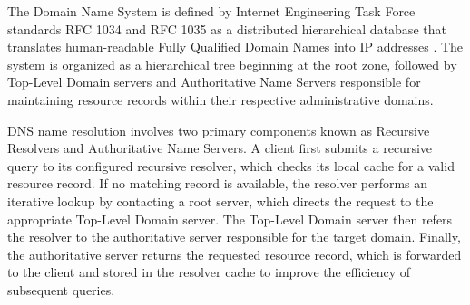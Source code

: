 \documentclass[14pt, a4paper, oneside]{report}
\begin{document}
The Domain Name System is defined by Internet Engineering Task Force standards RFC 1034 and RFC 1035 as a distributed hierarchical database that translates human-readable Fully Qualified Domain Names into IP addresses \cite{rfc1034, rfc1035}. The system is organized as a hierarchical tree beginning at the root zone, followed by Top-Level Domain servers and Authoritative Name Servers responsible for maintaining resource records within their respective administrative domains.

DNS name resolution involves two primary components known as Recursive Resolvers and Authoritative Name Servers. A client first submits a recursive query to its configured recursive resolver, which checks its local cache for a valid resource record. If no matching record is available, the resolver performs an iterative lookup by contacting a root server, which directs the request to the appropriate Top-Level Domain server. The Top-Level Domain server then refers the resolver to the authoritative server responsible for the target domain. Finally, the authoritative server returns the requested resource record, which is forwarded to the client and stored in the resolver cache to improve the efficiency of subsequent queries.
\end{document}
